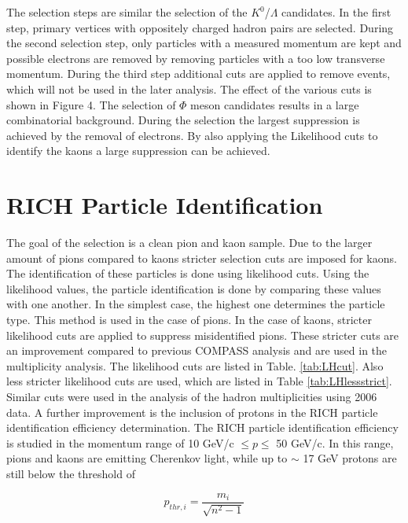 The selection steps are similar the selection of the $K^0$/$\Lambda$ candidates. In the first step, primary vertices with oppositely charged hadron pairs are selected. During the second selection step, only particles with a measured momentum are kept and possible electrons are removed by removing particles with a too low transverse momentum. During the third step additional cuts are applied to remove events, which will not be used in the later analysis. The effect of the various cuts is shown in Figure 4. The selection of $\Phi$ meson candidates results in a large combinatorial background. During the selection the largest suppression is achieved by the removal of electrons. By also applying the Likelihood cuts to identify the kaons a large suppression can be achieved.

\section{RICH Particle Identification}

The goal of the selection is a clean pion and kaon sample. Due to the larger amount of pions compared to kaons stricter selection cuts are imposed for kaons. The identification of these particles is done using likelihood cuts. Using the likelihood values, the particle identification is done by comparing these values with one another. In the simplest case, the highest one determines the particle type. This method is used in the case of pions. In the case of kaons, stricter likelihood cuts are applied to suppress misidentified pions. These stricter cuts are an improvement compared to previous COMPASS analysis and are used in the multiplicity analysis. The likelihood cuts are listed in Table. \ref{tab:LHcut}. Also less stricter likelihood cuts are used, which are listed in Table \ref{tab:LHlessstrict}. Similar cuts were used in the analysis of the hadron multiplicities using 2006 data. A further improvement is the inclusion of protons in the RICH particle identification efficiency determination. The RICH particle identification efficiency is studied in the momentum range of 10 GeV/c $ \leq p \leq $ 50 GeV/c. In this range, pions and kaons are emitting Cherenkov light, while up to $\sim$ 17 GeV protons are still below the threshold of

\begin{equation}
  p_{thr,i} = \frac{m_i}{ \sqrt{n^{2}-1} }
\end{equation}

